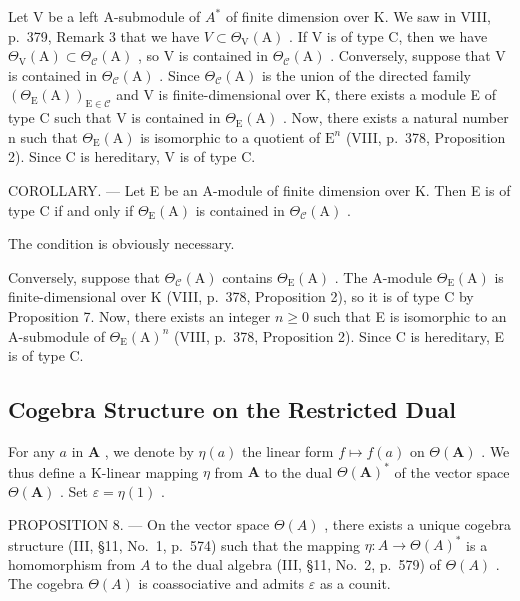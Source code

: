 Let V be a left A-submodule of \(A^{*}\) of finite dimension over K. We saw in VIII, p.~379, Remark 3 that we have \(V \subset \Theta_{\mathrm{V}}(\mathrm{A})\) . If V is of type C, then we have \(\Theta_{\mathrm{V}}(\mathrm{A}) \subset \Theta_{\mathcal{C}}(\mathrm{A})\) , so V is contained in \(\Theta_{\mathcal{C}}(\mathrm{A})\) . Conversely, suppose that V is contained in \(\Theta_{\mathcal{C}}(\mathrm{A})\) . Since \(\Theta_{\mathcal{C}}(\mathrm{A})\) is the union of the directed family \((\Theta_{\mathrm{E}}(\mathrm{A}))_{\mathrm{E}\in\mathcal{C}}\) and V is finite-dimensional over K, there exists a module E of type C such that V is contained in \(\Theta_{\mathrm{E}}(\mathrm{A})\) . Now, there exists a natural number n such that \(\Theta_{\mathrm{E}}(\mathrm{A})\) is isomorphic to a quotient of \(\mathrm{E}^{n}\) (VIII, p.~378, Proposition 2). Since C is hereditary, V is of type C.

COROLLARY. --- Let E be an A-module of finite dimension over K. Then E is of type C if and only if \(\Theta_{\mathrm{E}}(\mathrm{A})\) is contained in \(\Theta_{\mathcal{C}}(\mathrm{A})\) .

The condition is obviously necessary.

Conversely, suppose that \(\Theta_{\mathcal{C}}(\mathrm{A})\) contains \(\Theta_{\mathrm{E}}(\mathrm{A})\) . The A-module \(\Theta_{\mathrm{E}}(\mathrm{A})\) is finite-dimensional over K (VIII, p.~378, Proposition 2), so it is of type C by Proposition 7. Now, there exists an integer \(n \geqslant 0\) such that E is isomorphic to an A-submodule of \(\Theta_{\mathrm{E}}(\mathrm{A})^{n}\) (VIII, p.~378, Proposition 2). Since C is hereditary, E is of type C.

\subsection{Cogebra Structure on the Restricted Dual}

For any \(a\) in \(\mathbf{A}\) , we denote by \(\eta(a)\) the linear form \(f \mapsto f(a)\) on \(\Theta(\mathbf{A})\) . We thus define a K-linear mapping \(\eta\) from \(\mathbf{A}\) to the dual \(\Theta(\mathbf{A})^*\) of the vector space \(\Theta(\mathbf{A})\) . Set \(\varepsilon = \eta(1)\) .

PROPOSITION 8. --- On the vector space \(\Theta(A)\) , there exists a unique cogebra structure (III, §11, No.~1, p.~574) such that the mapping \(\eta: A \to \Theta(A)^*\) is a homomorphism from \(A\) to the dual algebra (III, §11, No.~2, p.~579) of \(\Theta(A)\) . The cogebra \(\Theta(A)\) is coassociative and admits \(\varepsilon\) as a counit.

